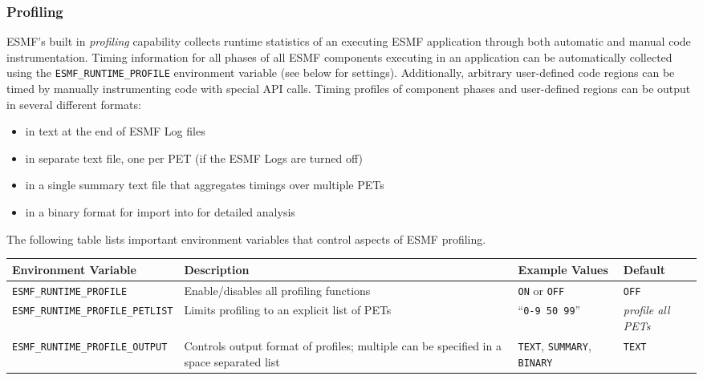 %

\subsubsection{Profiling}
\label{sec:Profiling}

ESMF's built in {\em profiling} capability collects runtime statistics
of an executing ESMF application through both automatic and manual code
instrumentation. Timing information for all phases of all ESMF components
executing in an application can be automatically collected using the
{\tt ESMF\_RUNTIME\_PROFILE} environment variable (see below for settings).
Additionally, arbitrary user-defined code regions can be timed by
manually instrumenting code with special API calls.  Timing profiles
of component phases and user-defined regions can be output in several
different formats:
\begin{itemize}
\item in text at the end of ESMF Log files
\item in separate text file, one per PET (if the ESMF Logs are turned off)
\item in a single summary text file that aggregates timings over multiple PETs
\item in a binary format for import into  for detailed analysis
\end{itemize}

The following table lists important environment variables that control
aspects of ESMF profiling.

\begin{tabular} {|p{6cm}|p{8cm}|p{6cm}|p{6cm}|}
     \hline\hline
     {\bf Environment Variable} & {\bf Description} & {\bf Example Values} & {\bf Default}\\
     \hline\hline
     {\tt ESMF\_RUNTIME\_PROFILE} & Enable/disables all profiling functions & {\tt ON} or {\tt OFF} & {\tt OFF} \\
     \hline\hline
     {\tt ESMF\_RUNTIME\_PROFILE\_PETLIST} & Limits profiling to an explicit list of PETs & ``{\tt 0-9 50 99}'' & {\em profile all PETs}\\
     \hline\hline
     {\tt ESMF\_RUNTIME\_PROFILE\_OUTPUT} & Controls output format of profiles;  multiple can be specified in a space separated list & {\tt TEXT}, {\tt SUMMARY}, {\tt BINARY} & {\tt TEXT} \\
     \hline\hline
\end{tabular}


